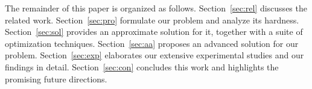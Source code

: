 %




%
%

%
%
The remainder of this paper is organized as follows.
Section~\ref{sec:rel} discusses the related work. 
Section~\ref{sec:pro} formulate our problem and analyze its hardness.
Section~\ref{sec:sol} provides an approximate solution for it, together with a suite of optimization techniques.
Section~\ref{sec:aa} proposes an advanced solution for our problem.
Section~\ref{sec:exp} elaborates our extensive experimental studies and our findings in detail.
Section~\ref{sec:con} concludes this work and highlights the promising future directions.
